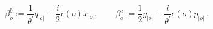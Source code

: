 \begin{equation}
\beta _{o}^{b}:={\frac{1}{{\theta ^{\prime }}}}q_{|o|}-{\frac{i}{2}}\epsilon
(o)x_{|o|},\qquad \beta _{o}^{c}:={\frac{1}{2}}y_{|o|}-{\frac{i}{{\theta
^{\prime }}}}\epsilon (o)p_{|o|}\,.
\end{equation}


